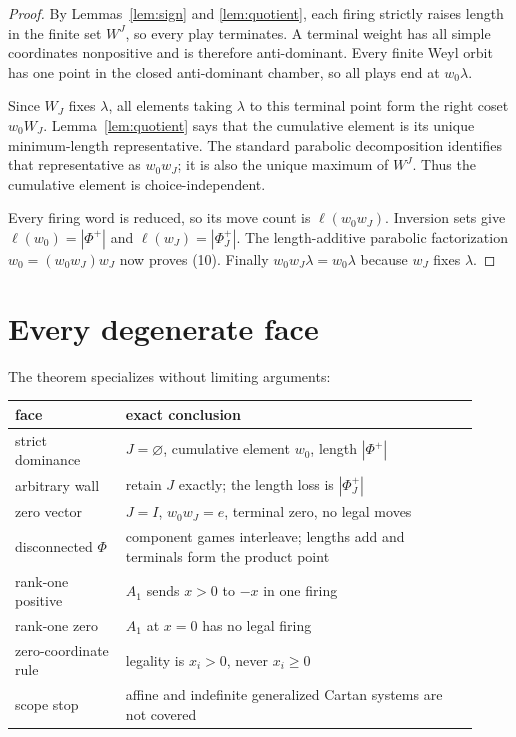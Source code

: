 \documentclass[10pt]{article}
\newcommand{\ellW}{\ell}
\begin{document}
\begin{proof}
By Lemmas~\ref{lem:sign} and \ref{lem:quotient}, each firing strictly raises
length in the finite set $W^J$, so every play terminates.  A terminal weight
has all simple coordinates nonpositive and is therefore anti-dominant.
Every finite Weyl orbit has one point in the closed anti-dominant chamber,
so all plays end at $w_0\lambda$.

Since $W_J$ fixes $\lambda$, all elements taking $\lambda$ to this terminal
point form the right coset $w_0W_J$.  Lemma~\ref{lem:quotient} says that the
cumulative element is its unique minimum-length representative.  The
standard parabolic decomposition identifies that representative as
$w_0w_J$; it is also the unique maximum of $W^J$.  Thus the cumulative
element is choice-independent.

Every firing word is reduced, so its move count is $\ellW(w_0w_J)$.  Inversion
sets give $\ellW(w_0)=|\Phi^+|$ and
$\ellW(w_J)=|\Phi_J^+|$.  The length-additive parabolic factorization
$w_0=(w_0w_J)w_J$ now proves (10).  Finally
$w_0w_J\lambda=w_0\lambda$ because $w_J$ fixes $\lambda$.
\end{proof}

\section{Every degenerate face}

The theorem specializes without limiting arguments:
\begin{center}
\small
\begin{tabular}{@{}>{\raggedright\arraybackslash}p{0.22\linewidth}
                    >{\raggedright\arraybackslash}p{0.70\linewidth}@{}}
\toprule
face & exact conclusion \\ \midrule
strict dominance & $J=\varnothing$, cumulative element $w_0$, length $|\Phi^+|$ \\
arbitrary wall & retain $J$ exactly; the length loss is $|\Phi_J^+|$ \\
zero vector & $J=I$, $w_0w_J=e$, terminal zero, no legal moves \\
disconnected $\Phi$ & component games interleave; lengths add and terminals form the product point \\
rank-one positive & $A_1$ sends $x>0$ to $-x$ in one firing \\
rank-one zero & $A_1$ at $x=0$ has no legal firing \\
zero-coordinate rule & legality is $x_i>0$, never $x_i\geq0$ \\
scope stop & affine and indefinite generalized Cartan systems are not covered \\
\bottomrule
\end{tabular}
\end{center}
\end{document}
